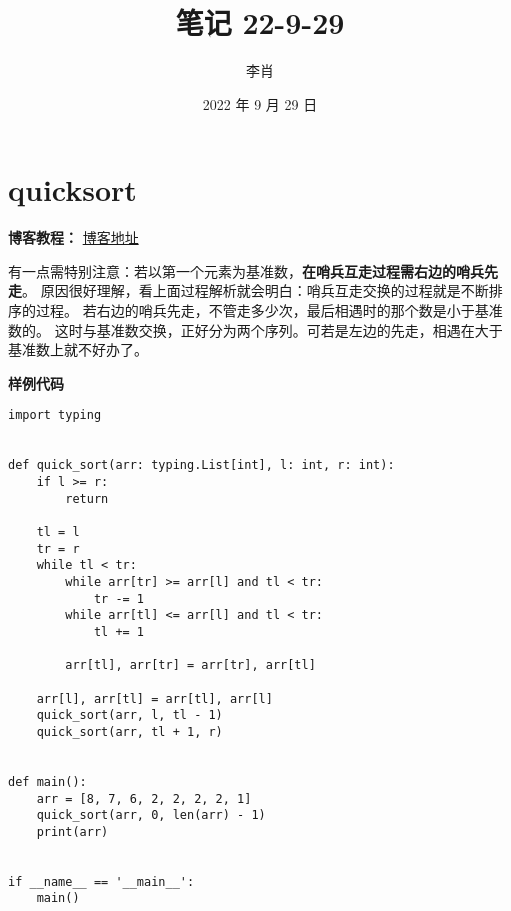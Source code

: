 \documentclass[UTF8]{ctexart}
\title{笔记 22-9-29}
\author{李肖}
\date{2022 年 9 月 29 日}
\begin{document}
\maketitle

\section{quicksort}

\noindent
\textbf{博客教程：} \href{https://blog.csdn.net/wthfeng/article/details/78037228}{博客地址}

\vskip 0.5cm
有一点需特别注意：若以第一个元素为基准数，\textbf{在哨兵互走过程需右边的哨兵先走}。
原因很好理解，看上面过程解析就会明白：哨兵互走交换的过程就是不断排序的过程。
若右边的哨兵先走，不管走多少次，最后相遇时的那个数是小于基准数的。
这时与基准数交换，正好分为两个序列。可若是左边的先走，相遇在大于基准数上就不好办了。

\vskip 0.5cm
\noindent
\textbf{样例代码}
\begin{lstlisting}
import typing


def quick_sort(arr: typing.List[int], l: int, r: int):
    if l >= r:
        return

    tl = l
    tr = r
    while tl < tr:
        while arr[tr] >= arr[l] and tl < tr:
            tr -= 1
        while arr[tl] <= arr[l] and tl < tr:
            tl += 1

        arr[tl], arr[tr] = arr[tr], arr[tl]

    arr[l], arr[tl] = arr[tl], arr[l]
    quick_sort(arr, l, tl - 1)
    quick_sort(arr, tl + 1, r)


def main():
    arr = [8, 7, 6, 2, 2, 2, 2, 1]
    quick_sort(arr, 0, len(arr) - 1)
    print(arr)


if __name__ == '__main__':
    main()
    
\end{lstlisting}
\end{document}

